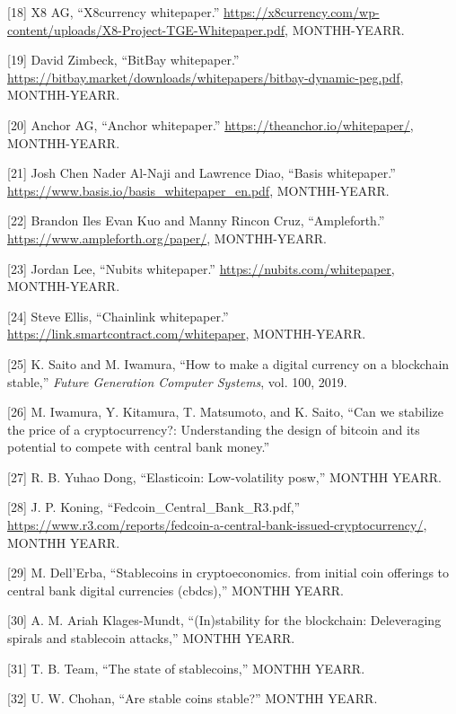 \documentclass[english,]{IEEEtran}
\begin{document}
\hypertarget{ref-x8currency:whitepaper}{}
{[}18{]} X8 AG, ``X8currency whitepaper.''
\url{https://x8currency.com/wp-content/uploads/X8-Project-TGE-Whitepaper.pdf},
MONTHH-YEARR.

\hypertarget{ref-BitBay:whitepaper}{}
{[}19{]} David Zimbeck, ``BitBay whitepaper.''
\url{https://bitbay.market/downloads/whitepapers/bitbay-dynamic-peg.pdf},
MONTHH-YEARR.

\hypertarget{ref-Anchor:whitepaper}{}
{[}20{]} Anchor AG, ``Anchor whitepaper.''
\url{https://theanchor.io/whitepaper/}, MONTHH-YEARR.

\hypertarget{ref-Basis:whitepaper}{}
{[}21{]} Josh Chen Nader Al-Naji and Lawrence Diao, ``Basis
whitepaper.'' \url{https://www.basis.io/basis_whitepaper_en.pdf},
MONTHH-YEARR.

\hypertarget{ref-Ampleforth:whitepaper}{}
{[}22{]} Brandon Iles Evan Kuo and Manny Rincon Cruz, ``Ampleforth.''
\url{https://www.ampleforth.org/paper/}, MONTHH-YEARR.

\hypertarget{ref-Nubits:whitepaper}{}
{[}23{]} Jordan Lee, ``Nubits whitepaper.''
\url{https://nubits.com/whitepaper}, MONTHH-YEARR.

\hypertarget{ref-Chainlink:whitepaper}{}
{[}24{]} Steve Ellis, ``Chainlink whitepaper.''
\url{https://link.smartcontract.com/whitepaper}, MONTHH-YEARR.

\hypertarget{ref-How_to_make_a_digital_currency_on_a_blockchain_stable}{}
{[}25{]} K. Saito and M. Iwamura, ``How to make a digital currency on a
blockchain stable,'' \emph{Future Generation Computer Systems}, vol.
100, 2019.

\hypertarget{ref-CanWeStabilize}{}
{[}26{]} M. Iwamura, Y. Kitamura, T. Matsumoto, and K. Saito, ``Can we
stabilize the price of a cryptocurrency?: Understanding the design of
bitcoin and its potential to compete with central bank money.''

\hypertarget{ref-Elasticoin_Low-Volatility_PoSW}{}
{[}27{]} R. B. Yuhao Dong, ``Elasticoin: Low-volatility posw,'' MONTHH
YEARR.

\hypertarget{ref-Fedcoin}{}
{[}28{]} J. P. Koning, ``Fedcoin\_Central\_Bank\_R3.pdf,''
\url{https://www.r3.com/reports/fedcoin-a-central-bank-issued-cryptocurrency/},
MONTHH YEARR.

\hypertarget{ref-Stablecoins_in_Cryptoeconomics}{}
{[}29{]} M. Dell'Erba, ``Stablecoins in cryptoeconomics. from initial
coin offerings to central bank digital currencies (cbdcs),'' MONTHH
YEARR.

\hypertarget{ref-In_stability_for_the_Blockchain}{}
{[}30{]} A. M. Ariah Klages-Mundt, ``(In)stability for the blockchain:
Deleveraging spirals and stablecoin attacks,'' MONTHH YEARR.

\hypertarget{ref-THE_STATE_OF_STABLECOINS}{}
{[}31{]} T. B. Team, ``The state of stablecoins,'' MONTHH YEARR.

\hypertarget{ref-Are_Stable_Coins_Stable}{}
{[}32{]} U. W. Chohan, ``Are stable coins stable?'' MONTHH YEARR.
\end{document}
